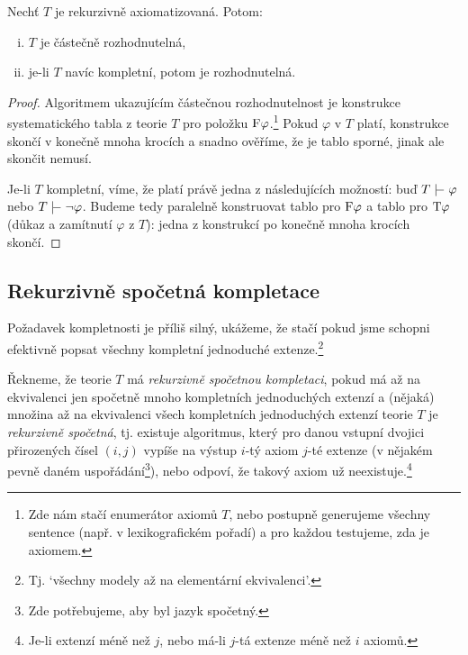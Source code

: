 \begin{proposition}
    Nechť $T$ je rekurzivně axiomatizovaná. Potom:
    \begin{enumerate}[(i)]
        \item $T$ je částečně rozhodnutelná,
        \item je-li $T$ navíc kompletní, potom je rozhodnutelná.
    \end{enumerate}
\end{proposition}
\begin{proof}
Algoritmem ukazujícím částečnou rozhodnutelnost je konstrukce systematického tabla z teorie $T$ pro položku $\mathrm{F}\varphi$.\footnote{Zde nám stačí enumerátor axiomů $T$, nebo postupně generujeme všechny sentence (např. v lexikografickém pořadí) a pro každou testujeme, zda je axiomem.} Pokud $\varphi$ v $T$ platí, konstrukce skončí v konečně mnoha krocích a snadno ověříme, že je tablo sporné, jinak ale skončit nemusí.

Je-li $T$ kompletní, víme, že platí právě jedna z následujících možností: buď $T\proves\varphi$ nebo $T\proves\neg\varphi$. Budeme tedy paralelně konstruovat tablo pro $\mathrm{F}\varphi$ a tablo pro $\mathrm{T}\varphi$ (důkaz a zamítnutí $\varphi$ z $T$): jedna z konstrukcí po konečně mnoha krocích skončí.
\end{proof}


\subsection{Rekurzivně spočetná kompletace}

Požadavek kompletnosti je příliš silný, ukážeme, že stačí pokud jsme schopni efektivně popsat všechny kompletní jednoduché extenze.\footnote{Tj. `všechny modely až na elementární ekvivalenci'.}

\begin{definition}
Řekneme, že teorie $T$ má \emph{rekurzivně spočetnou kompletaci}, pokud má až na ekvivalenci jen spočetně mnoho kompletních jednoduchých extenzí a (nějaká) množina až na ekvivalenci všech kompletních jednoduchých extenzí teorie $T$ je \emph{rekurzivně spočetná}, tj. existuje algoritmus, který pro danou vstupní dvojici přirozených čísel $(i,j)$ vypíše na výstup $i$-tý axiom $j$-té extenze (v nějakém pevně daném uspořádání\footnote{Zde potřebujeme, aby byl jazyk spočetný.}), nebo odpoví, že takový axiom už neexistuje.\footnote{Je-li extenzí méně než $j$, nebo má-li $j$-tá extenze méně než $i$ axiomů.}
\end{definition}

